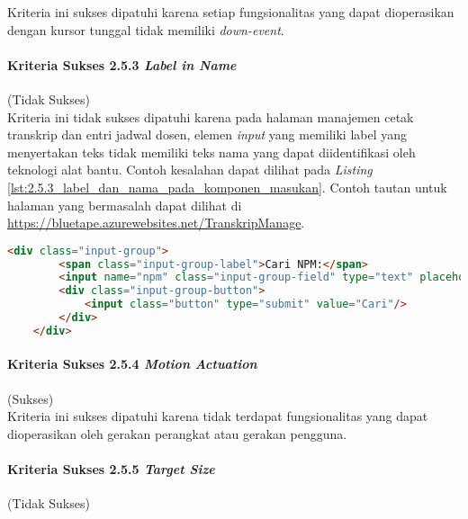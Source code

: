 Kriteria ini sukses dipatuhi karena setiap fungsionalitas yang dapat dioperasikan dengan kursor tunggal tidak memiliki \textit{down-event}.

\paragraph{Kriteria Sukses 2.5.3 \textit{Label in Name}}
\label{par:kepatuhan_bluetape_kriteria_sukses_2.5.3}
(Tidak Sukses)\\

Kriteria ini tidak sukses dipatuhi karena pada halaman manajemen cetak transkrip dan entri jadwal dosen, elemen \textit{input} yang memiliki label yang menyertakan teks tidak memiliki teks nama yang dapat diidentifikasi oleh teknologi alat bantu. Contoh kesalahan dapat dilihat pada \textit{Listing} \ref{lst:2.5.3_label_dan_nama_pada_komponen_masukan}. Contoh tautan untuk halaman yang bermasalah dapat dilihat di \url{https://bluetape.azurewebsites.net/TranskripManage}.

\begin{lstlisting}[frame=single, label={lst:2.5.3_label_dan_nama_pada_komponen_masukan}, language=HTML, caption=Pelanggaran Kriteria Sukses 2.5.3 pada Halaman Manajemen Cetak Transkrip]
    <div class="input-group">
        <span class="input-group-label">Cari NPM:</span>
        <input name="npm" class="input-group-field" type="text" placeholder="2013730013" maxlength="10" minlength="10"<?= $npmQuery === NULL ? '' : " value='$npmQuery'" ?>/>
        <div class="input-group-button">
            <input class="button" type="submit" value="Cari"/>
        </div>
    </div>
\end{lstlisting}

\paragraph{Kriteria Sukses 2.5.4 \textit{Motion Actuation}}
\label{par:kepatuhan_bluetape_kriteria_sukses_2.5.4}
(Sukses)\\

Kriteria ini sukses dipatuhi karena tidak terdapat fungsionalitas yang dapat dioperasikan oleh gerakan perangkat atau gerakan pengguna.

\paragraph{Kriteria Sukses 2.5.5 \textit{Target Size}}
\label{par:kepatuhan_bluetape_kriteria_sukses_2.5.5}
(Tidak Sukses)\\

